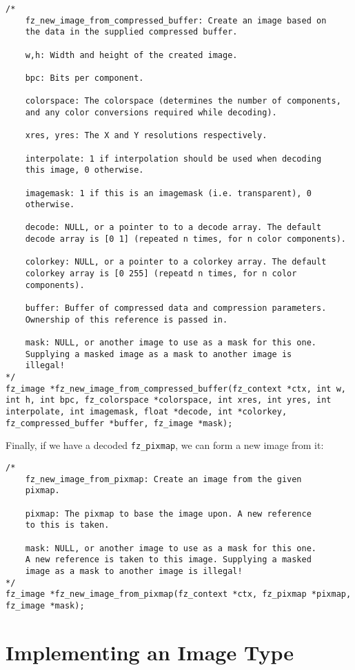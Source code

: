 \documentclass[oneside]{book}
\begin{document}
\begin{lstlisting}
/*
	fz_new_image_from_compressed_buffer: Create an image based on
	the data in the supplied compressed buffer.

	w,h: Width and height of the created image.

	bpc: Bits per component.

	colorspace: The colorspace (determines the number of components,
	and any color conversions required while decoding).

	xres, yres: The X and Y resolutions respectively.

	interpolate: 1 if interpolation should be used when decoding
	this image, 0 otherwise.

	imagemask: 1 if this is an imagemask (i.e. transparent), 0
	otherwise.

	decode: NULL, or a pointer to to a decode array. The default
	decode array is [0 1] (repeated n times, for n color components).

	colorkey: NULL, or a pointer to a colorkey array. The default
	colorkey array is [0 255] (repeatd n times, for n color
	components).

	buffer: Buffer of compressed data and compression parameters.
	Ownership of this reference is passed in.

	mask: NULL, or another image to use as a mask for this one.
	Supplying a masked image as a mask to another image is
	illegal!
*/
fz_image *fz_new_image_from_compressed_buffer(fz_context *ctx, int w, int h, int bpc, fz_colorspace *colorspace, int xres, int yres, int interpolate, int imagemask, float *decode, int *colorkey, fz_compressed_buffer *buffer, fz_image *mask);
\end{lstlisting}

Finally, if we have a decoded \texttt{fz\_pixmap}, we can form a new image from it:

\begin{lstlisting}
/*
	fz_new_image_from_pixmap: Create an image from the given
	pixmap.

	pixmap: The pixmap to base the image upon. A new reference
	to this is taken.

	mask: NULL, or another image to use as a mask for this one.
	A new reference is taken to this image. Supplying a masked
	image as a mask to another image is illegal!
*/
fz_image *fz_new_image_from_pixmap(fz_context *ctx, fz_pixmap *pixmap, fz_image *mask);
\end{lstlisting}

\section{Implementing an Image Type}
\end{document}
